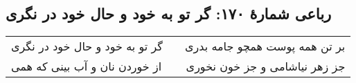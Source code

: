 \begin{center}
\section*{رباعی شمارهٔ ۱۷۰: گر تو به خود و حال خود در نگری}
\label{sec:170}
\begin{longtable}{l p{0.5cm} r}
گر تو به خود و حال خود در نگری
&&
بر تن همه پوست همچو جامه بدری
\\
از خوردن نان و آب بینی که همی 
&&
جز زهر نیاشامی و جز خون نخوری
\\
\end{longtable}
\end{center}

